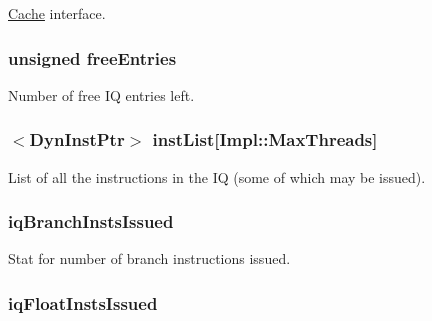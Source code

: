 \label{classInstQueue_a22dc8294eecb144fbdd951d2e32e9330}
\hyperlink{classCache}{Cache} interface. \hypertarget{classInstQueue_ac2281ff630f82397bda33269f4ee8796}{
\subsubsection[{freeEntries}]{\setlength{\rightskip}{0pt plus 5cm}unsigned {\bf freeEntries}}}
\label{classInstQueue_ac2281ff630f82397bda33269f4ee8796}
Number of free IQ entries left. \hypertarget{classInstQueue_a7f2828a4f877a4a4d4b85a6788536b82}{
\subsubsection[{instList}]{$<${\bf DynInstPtr}$>$ {\bf instList}\mbox{[}Impl::MaxThreads\mbox{]}}}
\label{classInstQueue_a7f2828a4f877a4a4d4b85a6788536b82}
List of all the instructions in the IQ (some of which may be issued). \hypertarget{classInstQueue_a928f22a2c6ce592adc40e5242c9d6572}{
\subsubsection[{iqBranchInstsIssued}]{ {\bf iqBranchInstsIssued}}}
\label{classInstQueue_a928f22a2c6ce592adc40e5242c9d6572}
Stat for number of branch instructions issued. \hypertarget{classInstQueue_aa9f2fa124c9f0b4b22461b6717449d9a}{
\subsubsection[{iqFloatInstsIssued}]{ {\bf iqFloatInstsIssued}}}

